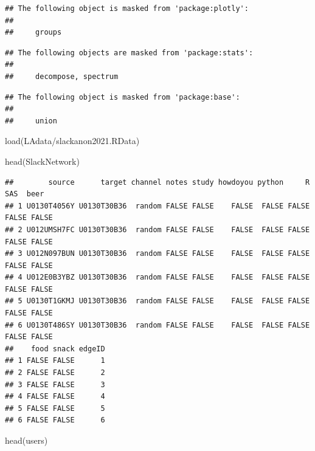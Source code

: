 \documentclass[
]{article}
\newenvironment{Shaded}{\begin{snugshade}}{\end{snugshade}}
\newcommand{\FunctionTok}[1]{\textcolor[rgb]{0.00,0.00,0.00}{#1}}
\newcommand{\NormalTok}[1]{#1}
\newcommand{\StringTok}[1]{\textcolor[rgb]{0.31,0.60,0.02}{#1}}
\theoremstyle{definition}
\theoremstyle{definition}
\theoremstyle{definition}
\theoremstyle{definition}
\theoremstyle{remark}
\begin{document}
\begin{verbatim}
## The following object is masked from 'package:plotly':
## 
##     groups
\end{verbatim}

\begin{verbatim}
## The following objects are masked from 'package:stats':
## 
##     decompose, spectrum
\end{verbatim}

\begin{verbatim}
## The following object is masked from 'package:base':
## 
##     union
\end{verbatim}

\begin{Shaded}
\begin{Highlighting}[]
\FunctionTok{load}\NormalTok{(}\StringTok{\textquotesingle{}LAdata/slackanon2021.RData\textquotesingle{}}\NormalTok{)}
\end{Highlighting}
\end{Shaded}

\begin{Shaded}
\begin{Highlighting}[]
\FunctionTok{head}\NormalTok{(SlackNetwork)}
\end{Highlighting}
\end{Shaded}

\begin{verbatim}
##        source      target channel notes study howdoyou python     R   SAS  beer
## 1 U0130T4056Y U0130T30B36  random FALSE FALSE    FALSE  FALSE FALSE FALSE FALSE
## 2 U012UMSH7FC U0130T30B36  random FALSE FALSE    FALSE  FALSE FALSE FALSE FALSE
## 3 U012N097BUN U0130T30B36  random FALSE FALSE    FALSE  FALSE FALSE FALSE FALSE
## 4 U012E0B3YBZ U0130T30B36  random FALSE FALSE    FALSE  FALSE FALSE FALSE FALSE
## 5 U0130T1GKMJ U0130T30B36  random FALSE FALSE    FALSE  FALSE FALSE FALSE FALSE
## 6 U0130T486SY U0130T30B36  random FALSE FALSE    FALSE  FALSE FALSE FALSE FALSE
##    food snack edgeID
## 1 FALSE FALSE      1
## 2 FALSE FALSE      2
## 3 FALSE FALSE      3
## 4 FALSE FALSE      4
## 5 FALSE FALSE      5
## 6 FALSE FALSE      6
\end{verbatim}

\begin{Shaded}
\begin{Highlighting}[]
\FunctionTok{head}\NormalTok{(users)}
\end{Highlighting}
\end{Shaded}
\end{document}
